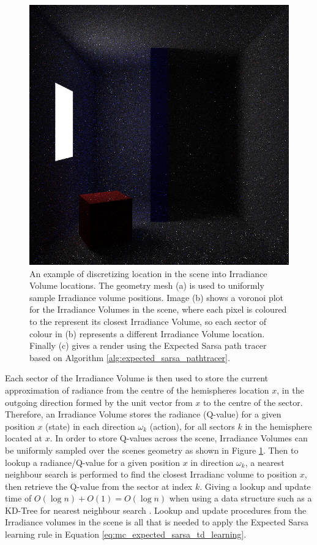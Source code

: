 \documentclass[ %
                    author={Callum Pearce},
                supervisor={Dr. Neill Campbell},
                    degree={MEng},
                     title={How effective are Temporal difference learning methods for reducing the number of zero contribution light paths, while still accurately approximating Global Illumination in Path tracing?},
                  subtitle={},
                      type={research},
                      year={2019} ]{dissertation}
\begin{document}
\begin{figure}[!htb]
\endminipage\hfill
{}
\includegraphics[width=1\textwidth]{images/renders/simple_room/reinforcement_16.png}
\endminipage
\caption{An example of discretizing location in the scene into Irradiance Volume locations. The geometry mesh (a) is used to uniformly sample Irradiance volume positions. Image (b) shows a voronoi plot for the Irradiance Volumes in the scene, where each pixel is coloured to the represent its closest Irradiance Volume, so each sector of colour in (b) represents a different Irradiance Volume location. Finally (c) gives a render using the Expected Sarsa path tracer based on Algorithm \ref{alg:expected_sarsa_pathtracer}.}
\label{fig:scene_discretization_example}
\end{figure}

Each sector of the Irradiance Volume is then used to store the current approximation of radiance from the centre of the hemispheres location $x$, in the outgoing direction formed by the unit vector from $x$ to the centre of the sector. Therefore, an Irradiance Volume stores the radiance (Q-value) for a given position $x$ (state) in each direction $\omega_k$ (action), for all sectors $k$ in the hemisphere located at $x$. In order to store Q-values across the scene, Irradiance Volumes can be uniformly sampled over the scenes geometry as shown in Figure \ref{fig:scene_discretization_example}. Then to lookup a radiance/Q-value for a given position $x$ in direction $\omega_k$, a nearest neighbour search is performed to find the closest Irradianc volume to position $x$, then retrieve the Q-value from the sector at index $k$. Giving a lookup and update time of $O(\log n) + O(1) = O(\log n)$ when using a data structure such as a KD-Tree for nearest neighbour search \cite{bentley1975multidimensional}. Lookup and update procedures from the Irradiance volumes in the scene is all that is needed to apply the Expected Sarsa learning rule in Equation \ref{eq:mc_expected_sarsa_td_learning}.
\end{document}
